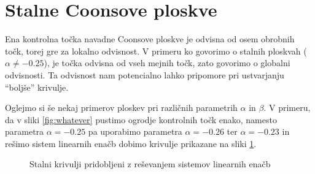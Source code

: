 \documentclass[a4paper,12pt]{article}
\begin{document}
\section{Stalne Coonsove ploskve}
\label{ch:4}

Ena kontrolna točka navadne Coonsove ploskve je odvisna od osem obrobnih točk, 
torej gre za lokalno odvisnost. V primeru ko govorimo o stalnih ploskvah 
($\alpha \neq  -0.25$), je točka odvisna od vseh mejnih točk, zato govorimo 
o globalni odvisnosti. Ta odvisnost nam potencialno lahko pripomore pri ustvarjanju 
``boljše'' krivulje.

Oglejmo si še nekaj primerov ploskev pri različnih parametrih $\alpha$ in $\beta$.
V primeru, da v sliki \ref{fig:whatever} pustimo ogrodje kontrolnih točk enako,
namesto parametra $\alpha =- 0.25$ pa uporabimo 
parametra $\alpha = -0.26$ ter $\alpha = -0.23$ in rešimo sistem
linearnih enačb dobimo krivulje prikazane na sliki \ref{fig:coons_pospl}.

\begin{figure}[ht!]
   \centering
   \caption{Stalni krivulji pridobljeni z reševanjem sistemov linearnih enačb}
\label{fig:coons_pospl}
\end{figure}
\end{document}
